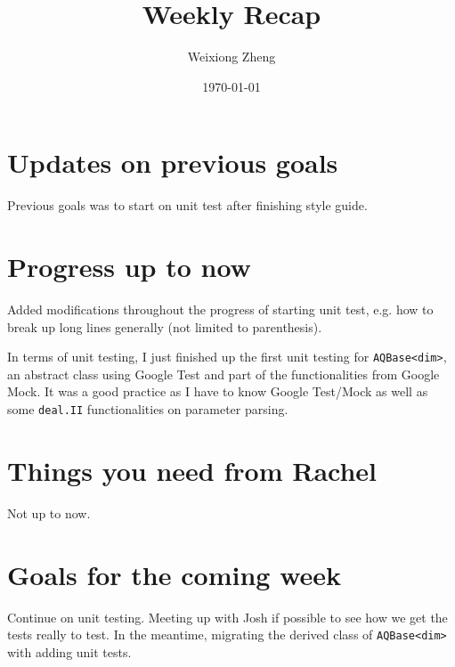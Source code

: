 \documentclass{article}
\title{Weekly Recap} %
\author{Weixiong Zheng} %
\date{\today} %
\begin{document}
\maketitle %

\section{Updates on previous goals}
Previous goals was to start on unit test after finishing style guide.

\section{Progress up to now}
Added modifications throughout the progress of starting unit test, e.g. how to break up long lines generally (not limited to parenthesis).

In terms of unit testing, I just finished up the first unit testing for {\tt AQBase<dim>}, an abstract class using Google Test and part of the functionalities from Google Mock. It was a good practice as I have to know Google Test/Mock as well as some {\tt deal.II} functionalities on parameter parsing.

\section{Things you need from Rachel}
Not up to now.

\section{Goals for the coming week}
Continue on unit testing. Meeting up with Josh if possible to see how we get the tests really to test. In the meantime, migrating the derived class of {\tt  AQBase<dim>} with adding unit tests.
\end{document}
